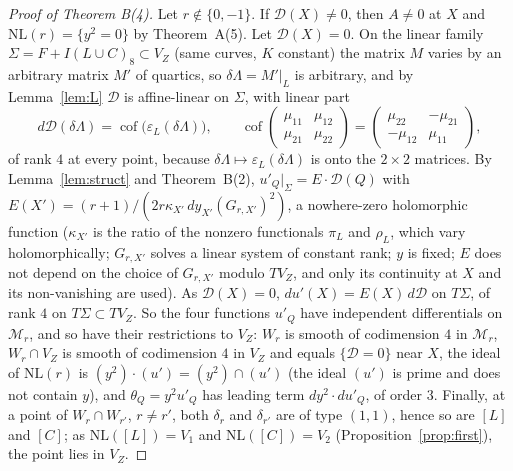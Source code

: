 \documentclass[11pt]{article}
\numberwithin{equation}{section}
\theoremstyle{remark}
\newcommand{\NL}{\mathrm{NL}}
\newcommand{\VZ}{V_Z}
\newcommand{\cD}{\mathcal{D}}
\newcommand{\cM}{\mathcal{M}}
\begin{document}
\begin{proof}[Proof of Theorem B(4)]
Let $r\notin\{0,-1\}$. If $\cD(X)\neq0$, then $A\ne0$ at $X$ and $\NL(r)=\{y^2=0\}$ by Theorem~A(5). Let
$\cD(X)=0$. On the linear family $\Sigma=F+I(L\cup C)_8\subset\VZ$ (same curves, $K$ constant) the matrix $M$
varies by an arbitrary matrix $M'$ of quartics, so $\delta\Lambda=M'|_L$ is arbitrary, and by
Lemma~\ref{lem:L} $\cD$ is affine-linear on $\Sigma$, with linear part
\[
d\cD(\delta\Lambda)=\operatorname{cof}\bigl(\varepsilon_L(\delta\Lambda)\bigr),\qquad
\operatorname{cof}\begin{pmatrix}\mu_{11}&\mu_{12}\\\mu_{21}&\mu_{22}\end{pmatrix}
=\begin{pmatrix}\mu_{22}&-\mu_{21}\\-\mu_{12}&\mu_{11}\end{pmatrix},
\]
of rank $4$ at every point, because $\delta\Lambda\mapsto\varepsilon_L(\delta\Lambda)$ is onto the $2\times2$
matrices. By Lemma~\ref{lem:struct} and Theorem~B(2), $u'_Q|_\Sigma=E\cdot\cD(Q)$ with
$E(X')=(r+1)/(2r\kappa_{X'}\,dy_{X'}(G_{r,X'})^2)$, a nowhere-zero holomorphic function ($\kappa_{X'}$ is the
ratio of the nonzero functionals $\pi_L$ and $\rho_L$, which vary holomorphically; $G_{r,X'}$ solves a linear
system of constant rank; $y$ is fixed; $E$ does not depend on the choice of $G_{r,X'}$ modulo $T\VZ$, and only
its continuity at $X$ and its non-vanishing are used). As $\cD(X)=0$, $du'(X)=E(X)\,d\cD$ on $T\Sigma$, of rank $4$ on
$T\Sigma\subset T\VZ$. So the four functions $u'_Q$ have independent differentials on $\cM_r$, and so have
their restrictions to $\VZ$: $W_r$ is smooth of codimension $4$ in $\cM_r$, $W_r\cap\VZ$ is smooth of
codimension $4$ in $\VZ$ and equals $\{\cD=0\}$ near $X$, the ideal of $\NL(r)$ is $(y^2)\cdot(u')=(y^2)\cap(u')$
(the ideal $(u')$ is prime and does not contain $y$), and $\theta_Q=y^2u'_Q$ has leading term $dy^2\cdot du'_Q$,
of order $3$. Finally, at a point of $W_r\cap W_{r'}$, $r\ne r'$, both
$\delta_r$ and $\delta_{r'}$ are of type $(1,1)$, hence so are $[L]$ and $[C]$; as $\NL([L])=V_1$ and
$\NL([C])=V_2$ (Proposition~\ref{prop:first}), the point lies in $\VZ$.
\end{proof}
\end{document}
